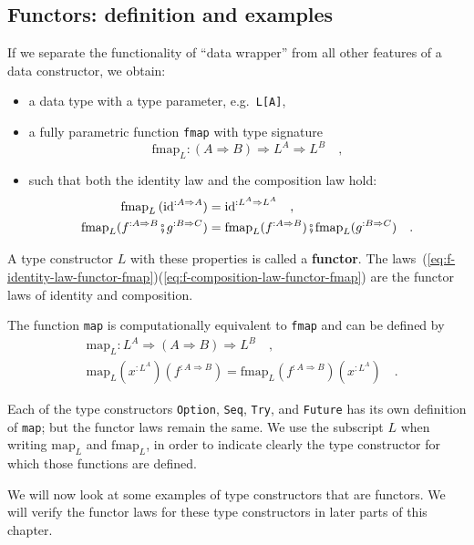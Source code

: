 \subsection{Functors: definition and examples\label{subsec:Functors:-definition-and-examples}}

If we separate the functionality of ``data wrapper'' from all other
features of a data constructor, we obtain:
\begin{itemize}
\item a data type with a type parameter, e.g.~\lstinline!L[A]!,
\item a fully parametric function \lstinline!fmap! with type signature
\[
\text{fmap}_{L}:\left(A\Rightarrow B\right)\Rightarrow L^{A}\Rightarrow L^{B}\quad,
\]
\item such that both the identity law and the composition law hold:
\begin{align}
\text{fmap}_{L}\,(\text{id}^{:A\Rightarrow A}) & =\text{id}^{:L^{A}\Rightarrow L^{A}}\quad,\label{eq:f-identity-law-functor-fmap}\\
\text{fmap}_{L}(f^{:A\Rightarrow B}\bef g^{:B\Rightarrow C}) & =\text{fmap}_{L}(f^{:A\Rightarrow B})\bef\text{fmap}_{L}(g^{:B\Rightarrow C})\quad.\label{eq:f-composition-law-functor-fmap}
\end{align}
\end{itemize}
A type constructor $L$ with these properties is called a \textbf{functor}.
The laws~(\ref{eq:f-identity-law-functor-fmap})\textendash (\ref{eq:f-composition-law-functor-fmap})
are the functor laws of identity and composition. 

The function \lstinline!map! is computationally equivalent to \lstinline!fmap!
and can be defined by
\begin{align*}
 & \text{map}_{L}:L^{A}\Rightarrow\left(A\Rightarrow B\right)\Rightarrow L^{B}\quad,\\
 & \text{map}_{L}(x^{:L^{A}})(f^{:A\Rightarrow B})=\text{fmap}_{L}(f^{:A\Rightarrow B})(x^{:L^{A}})\quad.
\end{align*}

Each of the type constructors \lstinline!Option!, \lstinline!Seq!,
\lstinline!Try!, and \lstinline!Future! has its own definition of
\lstinline!map!; but the functor laws remain the same. We use the
subscript $L$ when writing $\text{map}_{L}$ and $\text{fmap}_{L}$,
in order to indicate clearly the type constructor for which those
functions are defined.

We will now look at some examples of type constructors that are functors.
We will verify the functor laws for these type constructors in later
parts of this chapter.

